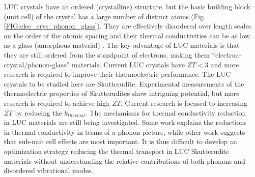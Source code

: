 \documentclass[letterpaper,12pt]{article}
\begin{document}
LUC crystals have an ordered (crystalline) structure, but the basic building block (unit cell) of the crystal has a large number of distinct atoms (Fig. \ref{FIG:elec_crys_phonon_glass}).\cite{cm052055b,Yang_Chen_2006,wang_232107} They are effectively disordered over length scales on the order of the atomic spacing and their thermal conductivities can be as low as a glass (amorphous material) \cite{cm052055b,Yang_Chen_2006,wang_232107}. The key advantage of LUC materials is that they are still ordered from the standpoint of electrons, making them “electron-crystal/phonon-glass” materials. Current LUC crystals have $ZT < 3$ \cite{cm052055b,Yang_Chen_2006,wang_232107} and more research is required to improve their thermoelectric performance. The LUC crystals to be studied here are Skutterudite.\cite{cm052055b} Experimental measurements of the thermoelectric properties of Skutterudites show intriguing potential,\cite{cm052055b,Yang_Chen_2006,wang_232107} but more research is required to achieve high $ZT$. 
Current research is focused to increasing $ZT$ by reducing the $k_{thermal}$.\cite{keppens1998,Sales_Chakoumakos_Mandrus_Sharp_1999,doi:10.1021/ja063695y} The mechanisms for thermal conductivity reduction in LUC materials are still being investigated.\cite{Sales_Chakoumakos_Mandrus_Sharp_1999,qiu:063713} Some work explains the reductions in thermal conductivity in terms of a phonon picture,\cite{Toberer2011,Yang_Chen_2006,Christensen2008} while other work suggests that sub-unit cell effects are most important.\cite{PhysRevLett.82.779} It is thus difficult to develop an optimization strategy reducing the thermal transport in LUC Skutterudite materials without understanding the relative contributions of both phonons and disordered vibrational modes.
\end{document}
